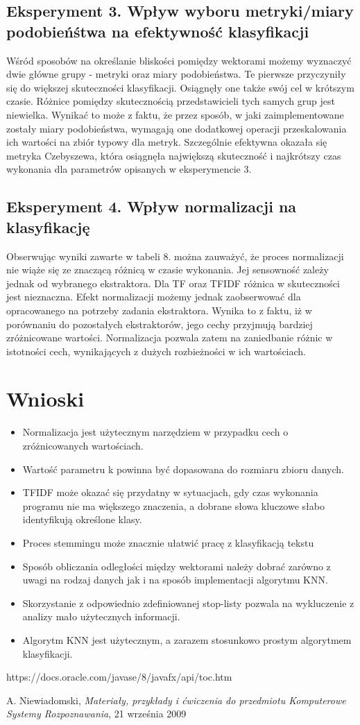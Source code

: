 \documentclass{classrep}
\begin{document}
\subsection{Eksperyment 3. Wpływ wyboru metryki/miary podobieńśtwa na efektywność klasyfikacji}
Wśród sposobów na określanie bliskości pomiędzy wektorami możemy wyznaczyć dwie główne grupy - metryki oraz miary podobieństwa. Te pierwsze przyczyniły się do większej skuteczności klasyfikacji. Osiągnęły one także swój cel w krótszym czasie. Różnice pomiędzy skutecznością przedstawicieli tych samych grup jest niewielka. Wynikać to może z faktu, że przez sposób, w jaki zaimplementowane zostały miary podobieństwa, wymagają one dodatkowej operacji przeskalowania ich wartości na zbiór typowy dla metryk. Szczególnie efektywna okazała się metryka Czebyszewa, która osiągnęła największą skuteczność i najkrótszy czas wykonania dla parametrów opisanych w eksperymencie 3. 
\subsection{Eksperyment 4. Wpływ normalizacji na klasyfikację}
Obserwując wyniki zawarte w tabeli 8. można zauważyć, że proces normalizacji nie wiąże się ze znaczącą różnicą w czasie wykonania. Jej sensowność zależy jednak od wybranego ekstraktora. Dla TF oraz TFIDF różnica w skuteczności jest nieznaczna. Efekt normalizacji możemy jednak zaobserwować dla opracowanego na potrzeby zadania ekstraktora. Wynika to z faktu, iż w porównaniu do pozostałych ekstraktorów, jego cechy przyjmują bardziej zróżnicowane wartości. Normalizacja pozwala zatem na zaniedbanie różnic w istotności cech, wynikających z dużych rozbieżności w ich wartościach.
\section{Wnioski}
\begin{itemize}
	\item Normalizacja jest użytecznym narzędziem w przypadku cech o zróżnicowanych wartościach.
	\item Wartość parametru k powinna być dopasowana do rozmiaru zbioru danych.
	\item TFIDF może okazać się przydatny w sytuacjach, gdy czas wykonania programu nie ma większego znaczenia, a dobrane słowa kluczowe słabo identyfikują określone klasy.
	\item Proces stemmingu może znacznie ułatwić pracę z klasyfikacją tekstu
	\item Sposób obliczania odległości między wektorami należy dobrać zarówno z uwagi na rodzaj danych jak i na sposób implementacji algorytmu KNN.
	\item Skorzystanie z odpowiednio zdefiniowanej stop-listy pozwala na wykluczenie z analizy mało użytecznych informacji.
	\item Algorytm KNN jest użytecznym, a zarazem stosunkowo prostym algorytmem klasyfikacji.
\end{itemize}

\begin{thebibliography}{0}

https://docs.oracle.com/javase/8/javafx/api/toc.htm

A. Niewiadomski, \textit{Materiały, przykłady i ćwiczenia do przedmiotu Komputerowe Systemy Rozpoznawania}, 21 września 2009 

\end{thebibliography}
\end{document}

